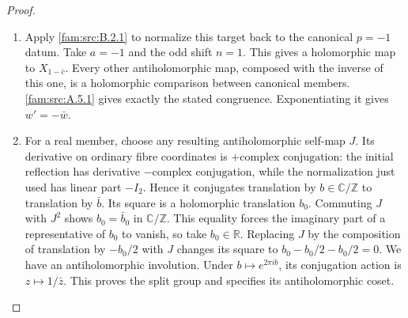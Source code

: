 \begin{proof}
\begin{enumerate}[label=\arabic*.,leftmargin=*]
\item Apply \ref{fam:src:B.2.1} to normalize this target back to the canonical $p=-1$ datum. Take $a=-1$ and the odd shift $n=1$. This gives a holomorphic map to $X_{1-\bar c}$. Every other antiholomorphic map, composed with the inverse of this one, is a holomorphic comparison between canonical members. \ref{fam:src:A.5.1} gives exactly the stated congruence. Exponentiating it gives $w'=-\bar w$.

\item  For a real member, choose any resulting antiholomorphic self-map $J$. Its derivative on ordinary fibre coordinates is $+\text{complex conjugation}$: the initial reflection has derivative $-\text{complex conjugation}$, while the normalization just used has linear part $-I_2$. Hence it conjugates translation by $b\in\mathbb C/\mathbb Z$ to translation by $\bar b$. Its square is a holomorphic translation $b_0$. Commuting $J$ with $J^2$ shows $b_0=\bar b_0$ in $\mathbb C/\mathbb Z$. This equality forces the imaginary part of a representative of $b_0$ to vanish, so take $b_0\in\mathbb R$. Replacing $J$ by the composition of translation by $-b_0/2$ with $J$ changes its square to $b_0-b_0/2-b_0/2=0$. We have an antiholomorphic involution. Under $b\mapsto e^{2\pi ib}$, its conjugation action is $z\mapsto1/\bar z$. This proves the split group and specifies its antiholomorphic coset.
\end{enumerate}
\end{proof}
